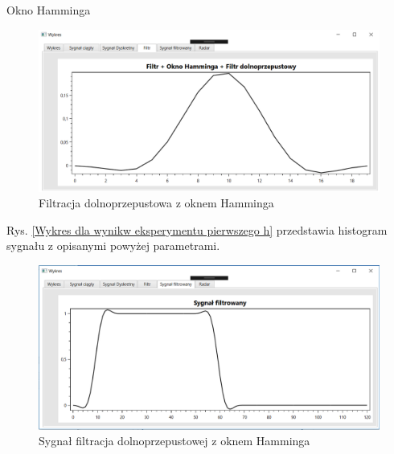 \documentclass[12pt]{article}
\begin{document}
\newpage
Okno Hamminga
\begin{figure}[h!]
 \centering
 \includegraphics[width=12.3cm]{prostFDOHm.PNG}
 \vspace{-0.3cm}
 \caption{Filtracja dolnoprzepustowa z oknem Hamminga}
 \label{Wykres dla wyników eksperymentu drugiego}
\end{figure}
\newpage
Rys. \ref{Wykres dla wynikw eksperymentu pierwszego h} przedstawia histogram sygnału z opisanymi powyżej parametrami. 
\begin{figure}[h!]
 \centering
 \includegraphics[width=12.3cm]{prostSFDHm.PNG}
 \vspace{-0.3cm}
 \caption{Sygnał filtracja dolnoprzepustowej z oknem Hamminga}
 \label{Histogram dla wyników eksperymentu drugiego}
\end{figure}
\end{document}
